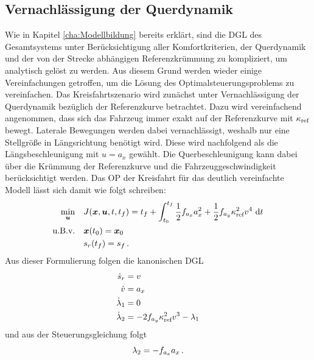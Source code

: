 \subsection{Vernachlässigung der Querdynamik}\label{subsec:Kreisfahrt_ohne_Querdynamik}
Wie in Kapitel \ref{cha:Modellbildung} bereits erklärt, sind die \gls{DGL} des Gesamtsystems unter Berücksichtigung aller Komfortkriterien, der Querdynamik und der von der Strecke abhängigen Referenzkrümmung zu kompliziert, um analytisch gelöst zu werden. Aus diesem Grund werden wieder einige Vereinfachungen getroffen, um die Lösung des Optimalsteuerungsproblems zu vereinfachen. Das Kreisfahrtszenario wird zunächst unter Vernachlässigung der Querdynamik bezüglich der Referenzkurve betrachtet. Dazu wird vereinfachend angenommen, dass sich das Fahrzeug immer exakt auf der Referenzkurve mit $\kappa_{\textrm{ref}}$ bewegt. Laterale Bewegungen werden dabei vernachlässigt, weshalb nur eine Stellgröße in Längsrichtung benötigt wird. Diese wird nachfolgend als die Längsbeschleunigung mit $u = a_x$ gewählt. Die Querbeschleunigung kann dabei über die Krümmung der Referenzkurve und die Fahrzeuggeschwindigkeit berücksichtigt werden. Das \gls{OP} der Kreisfahrt für das deutlich vereinfachte Modell lässt sich damit wie folgt schreiben: 
\begin{align}
\min_{\boldsymbol{u}} \quad & J(\boldsymbol{x},\boldsymbol{u},t,t_f) = t_f + \int_{t_0}^{t_f}\frac{1}{2}f_{a_x} a_x^2 + \frac{1}{2}f_{a_y} \kappa_{\textrm{ref}}^2v^4~\textrm{d}{t} \\
\textrm{u.B.v.} \quad& \boldsymbol{x}(t_0) = \boldsymbol{x}_0 \\
& s_r(t_f ) = s_f\,.
\end{align}
Aus dieser Formulierung folgen die kanonischen \gls{DGL} 
\begin{align}
\dot{s}_r &= v \\
\dot{v} &= a_x \label{eq:dot_v_ax}\\
\dot{\lambda}_1 &= 0 \\
\dot{\lambda}_2 &= -2f_{a_y} \kappa_{\textrm{ref}}^2v^3 - \lambda_1 \label{eq:dot_l2_Kreisfahrt}
\end{align}
und aus der Steuerungsgleichung folgt
\begin{equation}
	\lambda_2 = -f_{a_x} a_x\,. \label{eq:l2_Kreisfahrt}
\end{equation}

